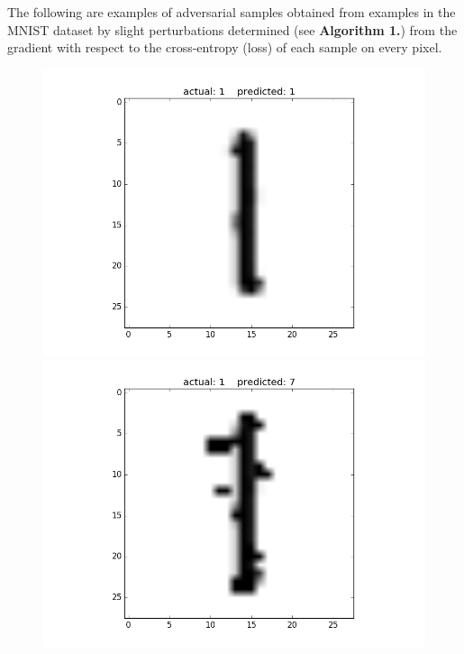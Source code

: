 \documentclass{article}
\begin{document}
The following are examples of adversarial samples obtained from examples in the MNIST dataset by slight perturbations determined (see \textbf{Algorithm 1.}) from the gradient with respect to the cross-entropy (loss) of each sample on every pixel. 
\newpage
\begin{figure}[h!]
	\begin{minipage}{0.5\textwidth}
		\centering
		\includegraphics[width=\textwidth]{sample_original1.png}
	\end{minipage} \hfill
	\begin{minipage}{0.5\textwidth}
		\centering
		\includegraphics[width=\textwidth]{sample_perturbed1.png}
	\end{minipage} 
\end{figure}
\end{document}
